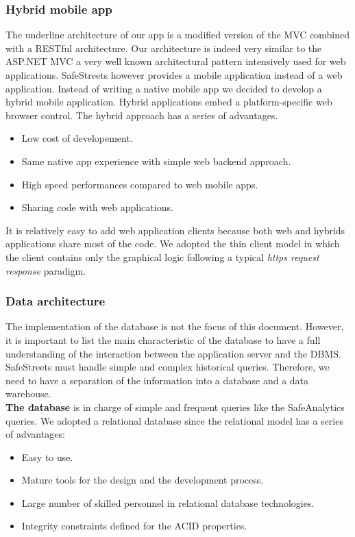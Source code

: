 \documentclass[./main.tex]{subfiles}
\begin{document}
\subsubsection{Hybrid mobile app}
The underline architecture of our app is a modified version of the MVC combined with a RESTful architecture. Our architecture is indeed very similar to the ASP.NET MVC a very well known architectural pattern intensively used for web applications. SafeStreets however provides a mobile application instead of a web application. Instead of writing a native mobile app we decided to develop a hybrid mobile application. Hybrid applications embed a platform-specific web browser control. The hybrid approach has a series of advantages. 
\begin{itemize}
\item Low cost of developement.
\item Same native app experience with simple web backend approach.
\item High speed performances compared to web mobile apps.
\item Sharing code with web applications.
\end{itemize}

It is relatively easy to add web application clients because both web and hybrids applications share most of the code. We adopted the thin client model in which the client contains only the graphical logic following a typical \textit{ https request response } paradigm.

\subsubsection{Data architecture}

The implementation of the database is not the focus of this document. However, it is important to list the main characteristic of the database to have a full understanding of the interaction between the application server and the DBMS.
SafeStreets must handle simple and complex historical queries. Therefore, we need to have a separation of the information into a database and a data warehouse.\medskip\\
\textbf{The database} is in charge of simple and frequent queries like the SafeAnalytics queries. We adopted a relational database since the relational model has a series of advantages:
\begin{itemize}
\item Easy to use.
\item Mature tools for the design and the development process.
\item Large number of skilled personnel in relational database technologies.
\item Integrity constraints defined for the ACID properties.
\end{itemize} 
\end{document}
